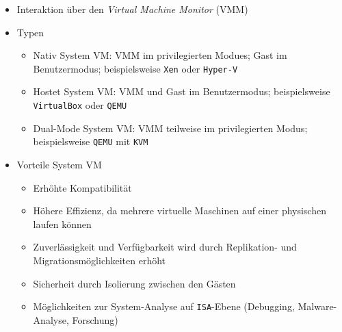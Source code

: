 \begin{itemize}
\begin{itemize}
		\item Interaktion über den \textit{Virtual Machine Monitor} (VMM)
		\item Typen
		\begin{itemize}
			\item Nativ System VM: VMM im privilegierten Modues; Gast im Benutzermodus; beispielsweise \texttt{Xen} oder \texttt{Hyper-V}
			\item Hostet System VM: VMM und Gast im Benutzermodus; beispielsweise \texttt{VirtualBox} oder \texttt{QEMU}
			\item Dual-Mode System VM: VMM teilweise im privilegierten Modus; beispielsweise \texttt{QEMU} mit \texttt{KVM}
		\end{itemize}
		\item Vorteile System VM
		\begin{itemize}
			\item Erhöhte Kompatibilität
			\item Höhere Effizienz, da mehrere virtuelle Maschinen auf einer physischen laufen können
			\item Zuverlässigkeit und Verfügbarkeit wird durch Replikation- und Migrationsmöglichkeiten erhöht
			\item Sicherheit durch Isolierung zwischen den Gästen
			\item Möglichkeiten zur System-Analyse auf \texttt{ISA}-Ebene (Debugging, Malware-Analyse, Forschung)
		\end{itemize}
	\end{itemize}
\end{itemize}



